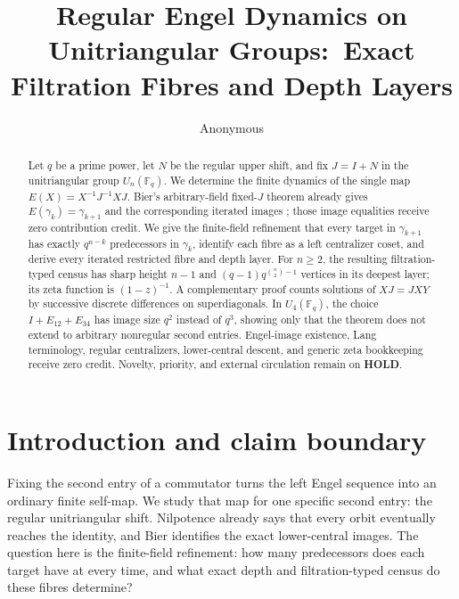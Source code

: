 \documentclass[10pt,a4paper]{amsart}
\title[Regular Engel dynamics]{Regular Engel Dynamics on Unitriangular
Groups:\ Exact Filtration Fibres and Depth Layers}
\author{Anonymous}
\date{}
\theoremstyle{definition}
\theoremstyle{remark}
\newcommand{\F}{\mathbb F}
\begin{document}
\begin{abstract}
Let $q$ be a prime power, let $N$ be the regular upper shift, and fix
$J=I+N$ in the unitriangular group $U_n(\F_q)$.  We determine the finite
dynamics of the single map $E(X)=X^{-1}J^{-1}XJ$.  Bier's arbitrary-field
fixed-$J$ theorem already gives $E(\gamma_k)=\gamma_{k+1}$ and the
corresponding iterated images \cite{Bier2013}; those image equalities receive
zero contribution credit.  We give the finite-field refinement that every
target in $\gamma_{k+1}$ has exactly $q^{n-k}$ predecessors in $\gamma_k$,
identify each fibre
as a left centralizer coset, and derive every iterated restricted fibre and
depth layer.  For $n\geq2$, the resulting filtration-typed census has sharp
height $n-1$ and $(q-1)q^{\binom n2-1}$ vertices in its deepest layer; its zeta function
is $(1-z)^{-1}$.  A complementary proof counts solutions of $XJ=JXY$ by
successive discrete differences on superdiagonals.  In $U_4(\F_q)$, the
choice $I+E_{12}+E_{34}$ has image size $q^2$ instead of $q^3$, showing only
that the theorem does not extend to arbitrary nonregular second entries.
Engel-image existence, Lang terminology, regular centralizers,
lower-central descent, and generic zeta bookkeeping receive zero credit.
Novelty, priority, and external circulation remain on \textbf{HOLD}.
\end{abstract}

\maketitle

\section{Introduction and claim boundary}
\label{sec:intro}

Fixing the second entry of a commutator turns the left Engel sequence into
an ordinary finite self-map.  We study that map for one specific second
entry: the regular unitriangular shift.  Nilpotence already says that every
orbit eventually reaches the identity, and Bier identifies the exact
lower-central images.  The question here is the finite-field refinement: how
many predecessors does each target have at every time, and what exact depth
and filtration-typed census do these fibres determine?
\end{document}
